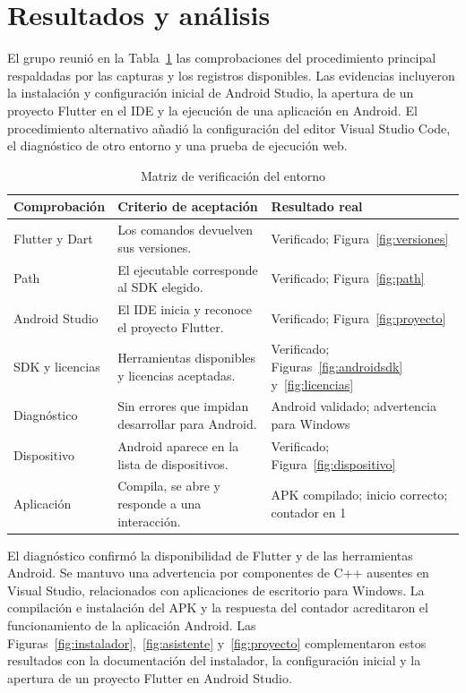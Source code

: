 \documentclass[12pt,letterpaper]{article}
\begin{document}
\section{Resultados y análisis}
El grupo reunió en la Tabla~\ref{tab:resultados} las comprobaciones del procedimiento principal respaldadas por las capturas y los registros disponibles. Las evidencias incluyeron la instalación y configuración inicial de Android Studio, la apertura de un proyecto Flutter en el IDE y la ejecución de una aplicación en Android. El procedimiento alternativo añadió la configuración del editor Visual Studio Code, el diagnóstico de otro entorno y una prueba de ejecución web.
\begin{table}[H]\centering
\caption{Matriz de verificación del entorno}\label{tab:resultados}
\begin{tabular}{@{}p{3cm}p{6.6cm}p{3.2cm}@{}}\toprule
Comprobación & Criterio de aceptación & Resultado real \\\midrule
Flutter y Dart & Los comandos devuelven sus versiones. & Verificado; Figura~\ref{fig:versiones} \\
Path & El ejecutable corresponde al SDK elegido. & Verificado; Figura~\ref{fig:path} \\
Android Studio & El IDE inicia y reconoce el proyecto Flutter. & Verificado; Figura~\ref{fig:proyecto} \\
SDK y licencias & Herramientas disponibles y licencias aceptadas. & Verificado; Figuras~\ref{fig:androidsdk} y~\ref{fig:licencias} \\
Diagnóstico & Sin errores que impidan desarrollar para Android. & Android validado; advertencia para Windows \\
Dispositivo & Android aparece en la lista de dispositivos. & Verificado; Figura~\ref{fig:dispositivo} \\
Aplicación & Compila, se abre y responde a una interacción. & APK compilado; inicio correcto; contador en 1 \\\bottomrule
\end{tabular}\end{table}
El diagnóstico confirmó la disponibilidad de Flutter y de las herramientas Android. Se mantuvo una advertencia por componentes de C++ ausentes en Visual Studio, relacionados con aplicaciones de escritorio para Windows. La compilación e instalación del APK y la respuesta del contador acreditaron el funcionamiento de la aplicación Android. Las Figuras~\ref{fig:instalador},~\ref{fig:asistente} y~\ref{fig:proyecto} complementaron estos resultados con la documentación del instalador, la configuración inicial y la apertura de un proyecto Flutter en Android Studio.
\end{document}
